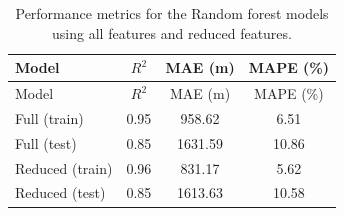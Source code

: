 \begin{longtable}{lccc}
\caption{Performance metrics for the Random forest models using all features and reduced features.} \label{tab:ml_results_small} \\
\hline
Model & $R^2$ & MAE (m) & MAPE (\%) \\
\hline
\endfirsthead
\hline
Model & $R^2$ & MAE (m) & MAPE (\%) \\
\hline
\endhead
Full (train) & 0.95 & 958.62 & 6.51\\
Full (test) & 0.85 & 1631.59 & 10.86\\
Reduced (train) & 0.96 & 831.17 & 5.62\\
Reduced (test) & 0.85 & 1613.63 & 10.58\\
\hline
\end{longtable}
